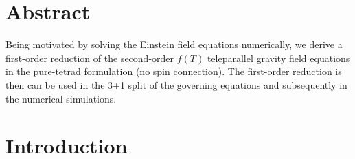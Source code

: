 \documentclass[
10pt, %
a4paper, %
oneside, %
headinclude,footinclude, %
BCOR5mm, %
]{scrartcl}
\begin{document}
\section*{Abstract} %
Being motivated by solving the Einstein field equations numerically, we derive a first-order 
reduction of the second-order $ f(T) $ teleparallel gravity field 
equations 
in the pure-tetrad formulation (no spin connection). The first-order reduction is then can be used 
in the 3+1 split of the governing equations and subsequently in the numerical simulations. 
\renewcommand{\thefootnote}{\arabic{footnote}}


\setlength\parindent{10pt} %
\setlength{\parskip}{5pt} %


\section{Introduction}
\end{document}
